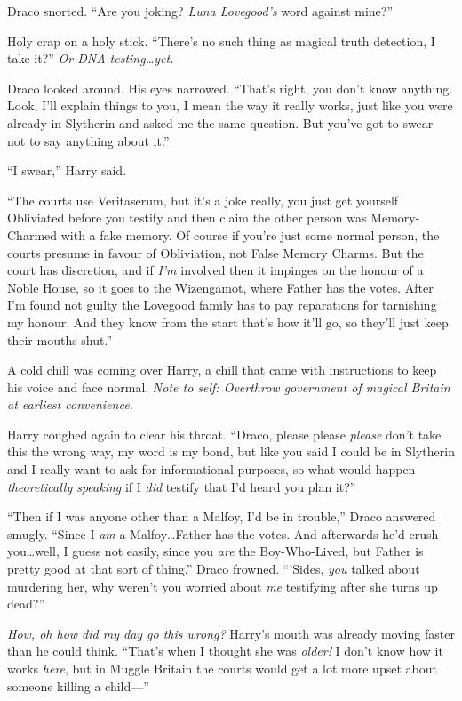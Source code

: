 Draco snorted. “Are you joking? \emph{Luna Lovegood’s} word against mine?”

Holy crap on a holy stick. “There’s no such thing as magical truth detection, I take it?” \emph{Or DNA testing…yet.}

Draco looked around. His eyes narrowed. “That’s right, you don’t know anything. Look, I’ll explain things to you, I mean the way it really works, just like you were already in Slytherin and asked me the same question. But you’ve got to swear not to say anything about it.”

“I swear,” Harry said.

“The courts use Veritaserum, but it’s a joke really, you just get yourself Obliviated before you testify and then claim the other person was Memory-Charmed with a fake memory. Of course if you’re just some normal person, the courts presume in favour of Obliviation, not False Memory Charms. But the court has discretion, and if \emph{I’m} involved then it impinges on the honour of a Noble House, so it goes to the Wizengamot, where Father has the votes. After I’m found not guilty the Lovegood family has to pay reparations for tarnishing my honour. And they know from the start that’s how it’ll go, so they’ll just keep their mouths shut.”

A cold chill was coming over Harry, a chill that came with instructions to keep his voice and face normal. \emph{Note to self: Overthrow government of magical Britain at earliest convenience.}

Harry coughed again to clear his throat. “Draco, please please \emph{please} don’t take this the wrong way, my word is my bond, but like you said I could be in Slytherin and I really want to ask for informational purposes, so what would happen \emph{theoretically speaking} if I \emph{did} testify that I’d heard you plan it?”

“Then if I was anyone other than a Malfoy, I’d be in trouble,” Draco answered smugly. “Since I \emph{am} a Malfoy…Father has the votes. And afterwards he’d crush you…well, I guess not easily, since you \emph{are} the Boy-Who-Lived, but Father is pretty good at that sort of thing.” Draco frowned. “’Sides, \emph{you} talked about murdering her, why weren’t you worried about \emph{me} testifying after she turns up dead?”

\emph{How, oh how did my day go this wrong?} Harry’s mouth was already moving faster than he could think. “That’s when I thought she was \emph{older!} I don’t know how it works \emph{here}, but in Muggle Britain the courts would get a lot more upset about someone killing a child—”

